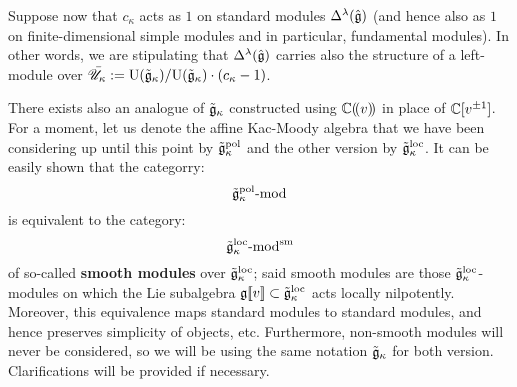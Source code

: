         \begin{convention}
            Suppose now that $c_{\kappa}$ acts as $1$ on standard modules $\Delta^{\lambda}(\hat{\mathfrak{g}})$ (and hence also as $1$ on finite-dimensional simple modules and in particular, fundamental modules). In other words, we are stipulating that $\Delta^{\lambda}(\hat{\mathfrak{g}})$ carries also the structure of a left-module over $\bar{\mathscr{U}}_{\kappa} := \mathrm{U}(\tilde{\mathfrak{g}}_{\kappa})/\mathrm{U}(\tilde{\mathfrak{g}}_{\kappa}) \cdot (c_{\kappa} - 1)$.
        \end{convention}

        \begin{remark}
            There exists also an analogue of $\tilde{\mathfrak{g}}_{\kappa}$ constructed using $\mathbb{C}(\!(v)\!)$ in place of $\mathbb{C}[v^{\pm 1}]$. For a moment, let us denote the affine Kac-Moody algebra that we have been considering up until this point by $\tilde{\mathfrak{g}}_{\kappa}^{\mathrm{pol}}$ and the other version by $\tilde{\mathfrak{g}}_{\kappa}^{\mathrm{loc}}$. It can be easily shown that the categorry:
                $$\tilde{\mathfrak{g}}_{\kappa}^{\mathrm{pol}}\text{-}\mathrm{mod}$$
            is equivalent to the category:
                $$\tilde{\mathfrak{g}}_{\kappa}^{\mathrm{loc}}\text{-}\mathrm{mod}^{\mathrm{sm}}$$
            of so-called \textbf{smooth modules} over $\tilde{\mathfrak{g}}_{\kappa}^{\mathrm{loc}}$; said smooth modules are those $\tilde{\mathfrak{g}}_{\kappa}^{\mathrm{loc}}$-modules on which the Lie subalgebra $\mathfrak{g}[\![v]\!] \subset \tilde{\mathfrak{g}}_{\kappa}^{\mathrm{loc}}$ acts locally nilpotently. Moreover, this equivalence maps standard modules to standard modules, and hence preserves simplicity of objects, etc. Furthermore, non-smooth modules will never be considered, so we will be using the same notation $\tilde{\mathfrak{g}}_{\kappa}$ for both version. Clarifications will be provided if necessary.
        \end{remark}

